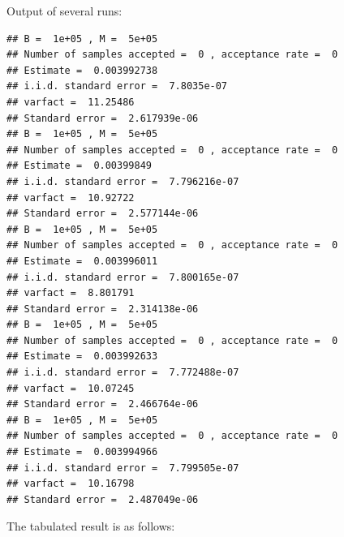 \begin{knitrout}
\begin{kframe}
\begin{alltt}
\hlstd{(}\hlstd{)}
\hlstd{(}\hlstd{)}
\hlstd{(}\hlstd{)}
\hlstd{(}\hlstd{)}
\hlstd{(}\hlstd{)}
\hlstd{(}\hlstd{)}
\end{alltt}
\end{kframe}
\end{knitrout}
Output of several runs:
\begin{knitrout}
\color{fgcolor}\begin{kframe}
\begin{verbatim}
## B =  1e+05 , M =  5e+05 
## Number of samples accepted =  0 , acceptance rate =  0 
## Estimate =  0.003992738 
## i.i.d. standard error =  7.8035e-07 
## varfact =  11.25486 
## Standard error =  2.617939e-06
## B =  1e+05 , M =  5e+05 
## Number of samples accepted =  0 , acceptance rate =  0 
## Estimate =  0.00399849 
## i.i.d. standard error =  7.796216e-07 
## varfact =  10.92722 
## Standard error =  2.577144e-06
## B =  1e+05 , M =  5e+05 
## Number of samples accepted =  0 , acceptance rate =  0 
## Estimate =  0.003996011 
## i.i.d. standard error =  7.800165e-07 
## varfact =  8.801791 
## Standard error =  2.314138e-06
## B =  1e+05 , M =  5e+05 
## Number of samples accepted =  0 , acceptance rate =  0 
## Estimate =  0.003992633 
## i.i.d. standard error =  7.772488e-07 
## varfact =  10.07245 
## Standard error =  2.466764e-06
## B =  1e+05 , M =  5e+05 
## Number of samples accepted =  0 , acceptance rate =  0 
## Estimate =  0.003994966 
## i.i.d. standard error =  7.799505e-07 
## varfact =  10.16798 
## Standard error =  2.487049e-06
\end{verbatim}
\end{kframe}
\end{knitrout}
The tabulated result is as follows:\\
